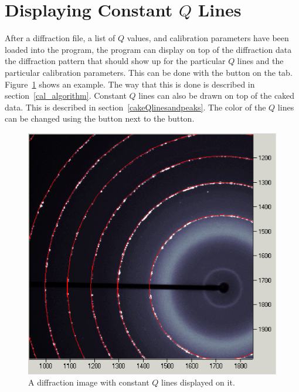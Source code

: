 \section{\texorpdfstring{Displaying Constant $Q$ 
    Lines}{Displaying Constant Q Lines}}
    \label{displayconstQlines}

After a diffraction file, a list of $Q$ values,
and calibration parameters have been loaded into
the program, the program can display on top of
the diffraction data the diffraction pattern that should
show up for the particular $Q$ lines and the
particular calibration parameters.
This can be done with the  button on the 
 tab. 
Figure~\ref{constant_q_lines_on_diffraction_image}
shows an example. The way that this is done is
described in section~\ref{cal_algorithm}.
Constant $Q$ lines can also be drawn on top of the
caked data. This is described in 
section~\ref{cakeQlinesandpeaks}.  The color of the 
$Q$ lines can be changed using the
 button next to the  
button.

\begin{figure}
    \centering
    \includegraphics[scale=.75]
        {figures/constant_q_lines_on_diffraction_image.eps}
    \caption{A diffraction image with constant 
    $Q$ lines displayed on it.}
    \label{constant_q_lines_on_diffraction_image}
\end{figure}

